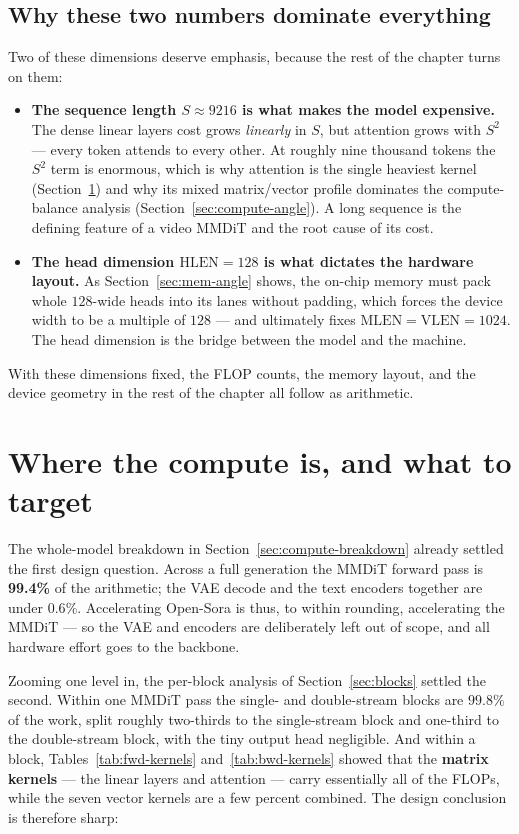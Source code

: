 \documentclass[11pt]{report}
\begin{document}
\subsection{Why these two numbers dominate everything}

Two of these dimensions deserve emphasis, because the rest of the chapter
turns on them:

\begin{itemize}
\item \textbf{The sequence length $S \approx 9216$ is what makes the model
expensive.} The dense linear layers cost grows \emph{linearly} in $S$, but
attention grows with $S^2$ --- every token attends to every other. At
roughly nine thousand tokens the $S^2$ term is enormous, which is why
attention is the single heaviest kernel (Section~\ref{sec:targets}) and why
its mixed matrix/vector profile dominates the compute-balance analysis
(Section~\ref{sec:compute-angle}). A long sequence is the defining feature
of a video MMDiT and the root cause of its cost.
\item \textbf{The head dimension $\text{HLEN}=128$ is what dictates the
hardware layout.} As Section~\ref{sec:mem-angle} shows, the on-chip memory
must pack whole $128$-wide heads into its lanes without padding, which forces
the device width to be a multiple of $128$ --- and ultimately fixes
$\text{MLEN}=\text{VLEN}=1024$. The head dimension is the bridge between the
model and the machine.
\end{itemize}

With these dimensions fixed, the FLOP counts, the memory layout, and the
device geometry in the rest of the chapter all follow as arithmetic.

\section{Where the compute is, and what to target}
\label{sec:targets}

The whole-model breakdown in Section~\ref{sec:compute-breakdown} already
settled the first design question. Across a full generation the MMDiT
forward pass is \textbf{99.4\%} of the arithmetic; the VAE decode and the
text encoders together are under $0.6\%$. Accelerating Open-Sora is thus,
to within rounding, accelerating the MMDiT --- so the VAE and encoders are
deliberately left out of scope, and all hardware effort goes to the
backbone.

Zooming one level in, the per-block analysis of Section~\ref{sec:blocks}
settled the second. Within one MMDiT pass the single- and double-stream
blocks are $99.8\%$ of the work, split roughly two-thirds to the
single-stream block and one-third to the double-stream block, with the tiny
output head negligible. And within a block, Tables~\ref{tab:fwd-kernels}
and~\ref{tab:bwd-kernels} showed that the \textbf{matrix kernels} --- the
linear layers and attention --- carry essentially all of the FLOPs, while
the seven vector kernels are a few percent combined. The design conclusion
is therefore sharp:
\end{document}
